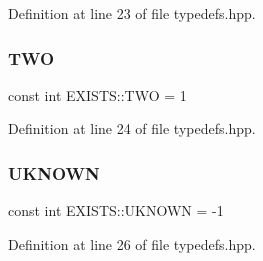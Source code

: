 Definition at line 23 of file typedefs.\+hpp.

\mbox{\label{namespace_e_x_i_s_t_s_ad76d02e8eb6d20715d333b72394b0648}} 
\subsubsection{\texorpdfstring{T\+WO}{TWO}}
{\footnotesize\ttfamily const int E\+X\+I\+S\+T\+S\+::\+T\+WO = 1}



Definition at line 24 of file typedefs.\+hpp.

\mbox{\label{namespace_e_x_i_s_t_s_a81eb362d951445c658942a433afddb97}} 
\subsubsection{\texorpdfstring{U\+K\+N\+O\+WN}{UKNOWN}}
{\footnotesize\ttfamily const int E\+X\+I\+S\+T\+S\+::\+U\+K\+N\+O\+WN = -\/1}



Definition at line 26 of file typedefs.\+hpp.

